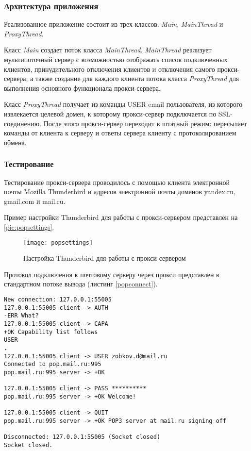 \subsubsection{Архитектура приложения}

Реализованное приложение состоит из трех классов: \textit{Main}, \textit{MainThread} и \textit{ProxyThread}.

Класс \textit{Main} создает поток класса \textit{MainThread}. \textit{MainThread} реализует мультипоточный сервер с возможностью отображать список подключенных клиентов, принудительного отключения клиентов и отключения самого прокси-сервера, а также создание для каждого клиента потока класса \textit{ProxyThread} для выполнения основного функционала прокси-сервера.

Класс \textit{ProxyThread} получает из команды USER email пользователя, из которого извлекается целевой домен, к которому прокси-сервер подключается по SSL-соединению. После этого прокси-сервер переходит в штатный режим: пересылает команды от клиента к серверу и ответы сервера клиенту с протоколированием обмена.

\subsubsection{Тестирование}

Тестирование прокси-сервера проводилось с помощью клиента электронной почты Mozilla Thunderbird и адресов электронной почты доменов yandex.ru, gmail.com и mail.ru.

Пример настройки Thunderbird для работы с прокси-сервером представлен на \vref{pic:popsettings}.

\begin{figure}[H]
	\centering
	\texttt{[image: popsettings]}
	\caption{Настройка Thunderbird для работы с прокси-сервером}
	\label{pic:popsettings}
\end{figure}

Протокол подключения к почтовому серверу через прокси представлен в стандартном потоке вывода (листинг \vref{popconnect}).

\begin{lstlisting}[label=popconnect,caption=Результат подключения к серверу]
New connection: 127.0.0.1:55005
127.0.0.1:55005	client -> AUTH
-ERR What?
127.0.0.1:55005	client -> CAPA
+OK Capability list follows
USER
.
127.0.0.1:55005	client -> USER zobkov.d@mail.ru
Connected to pop.mail.ru:995
pop.mail.ru:995	server -> +OK

127.0.0.1:55005	client -> PASS **********
pop.mail.ru:995	server -> +OK Welcome!

127.0.0.1:55005	client -> QUIT
pop.mail.ru:995	server -> +OK POP3 server at mail.ru signing off

Disconnected: 127.0.0.1:55005 (Socket closed)
Socket closed.
\end{lstlisting}


